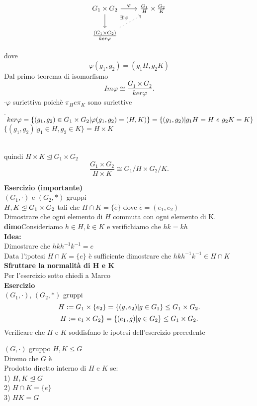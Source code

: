 \documentclass[12px]{article}
\begin{document}
	\begin{dimo}[4,5]
	\[
\begin{tikzcd}
G_1 \times G_2 \arrow[r, " \varphi"] \arrow[d] & \frac{G_1}{H} \times \frac{G_2}{K} \\
\frac{(G_1 \times G_2)}{ker \varphi} \arrow[ur, dotted, "\exists ! \bar \varphi"]
\end{tikzcd}
\]

dove 
\[
\varphi(g_1, g_2) = \left( g_1 H, g_2 K \right)
\]
	Dal primo teorema di isomorfismo
	\[
		Im \varphi \cong \frac {G_1\times G_2}{ker \varphi}
	.\] 
	$\cdot \varphi$ suriettiva poichè $\pi_H e \pi_K$ sono suriettive\\
	\begin{aligned*}
	$\cdot$ $\ ker \varphi = \{(g_1,g_2)\in G_1\times G_2| \varphi(g_1,g_2) = (H,K)\} \\= \{(g_1,g_2) | g_1H = H \ e \ g_2K = K\}$ \\
	$\{(g_1,g_2) | g_1\in H,g_2\in K\} = H\times K$
	\end{aligned*}\\
	quindi $H\times K\trianglelefteq G_1\times G_2$
	\[
		\frac{G_1\times G_2}{H\times K}\cong G_1/H\times G_2/K
	.\] 
	\end{dimo}
	\textbf{Esercizio (importante)}\\
	$(G_1,\cdot)$ e $(G_2,*)$ gruppi\\
	$H,K\trianglelefteq G_1\times G_2$ tali che $H\cap K = \{\tilde e\}$ dove  $\tilde e  = (e_1,e_2)$\\
	Dimostrare che ogni elemento di $H$ commuta con ogni elemento di K.
	\textbf{dimo}Consideriamo $h\in H, k\in K$ e verifichiamo che  $hk = kh$\\
	 \textbf{Idea:}\\
	 Dimostrare che $hkh^{-1}k^{-1} = e$\\
	 Data l'ipotesi  $H\cap K = \{e\}$ è sufficiente dimostrare che  $hkh^{-1}k^{-1}\in H\cap K$
	  \textbf{Sfruttare la normalità di H e K}\\
	  Per l'esercizio sotto chiedi a Marco\\
	  \textbf{Esercizio}\\
	  $(G_1,\cdot)$, $(G_2,*)$ gruppi
	  \[
		  H:= G_1\times \{e_2\} = \{(g,e_2)|g\in G_1\}\leq G_1\times G_2\\
	  .\] 
	  \[
		  H:= e_1\times G_2\} = \{(e_1,g)|g\in G_2\}\leq G_1\times G_2\\
	  .\] 
	  Verificare che $H$ e $K$ soddisfano le ipotesi dell'esercizio precedente
	  \begin{defi}
	  	$(G,\cdot)$ gruppo $H,K\leq G$\\
		Diremo che  $G$ è \\
		Prodotto diretto interno di $H$ e $K$ se:\\
		1) $H,K\trianglelefteq G$\\
		2)  $H\cap K = \{e\}$\\
		3)  $HK = G$
	  \end{defi}
\end{document}
